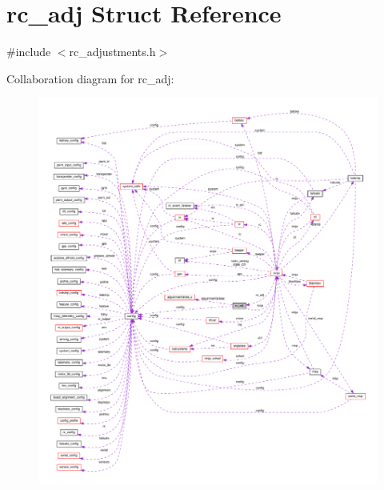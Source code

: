 \hypertarget{structrc__adj}{\section{rc\+\_\+adj Struct Reference}
\label{structrc__adj}
}


{\ttfamily \#include $<$rc\+\_\+adjustments.\+h$>$}



Collaboration diagram for rc\+\_\+adj\+:
\nopagebreak
\begin{figure}[H]
\begin{center}
\leavevmode
\includegraphics[width=350pt]{structrc__adj__coll__graph}
\end{center}
\end{figure}
